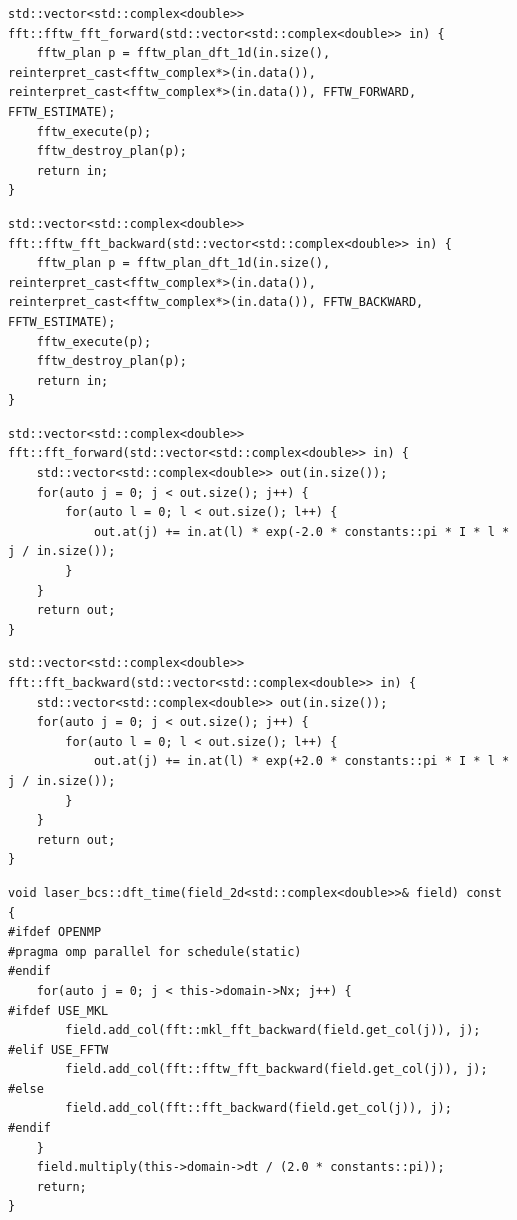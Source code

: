 \begin{lstlisting}[style=CXX, caption=Function performing forward fast Fourier transform using FFTW library]
std::vector<std::complex<double>> fft::fftw_fft_forward(std::vector<std::complex<double>> in) {
	fftw_plan p = fftw_plan_dft_1d(in.size(), reinterpret_cast<fftw_complex*>(in.data()), reinterpret_cast<fftw_complex*>(in.data()), FFTW_FORWARD, FFTW_ESTIMATE);
	fftw_execute(p);
	fftw_destroy_plan(p);
	return in;
}
\end{lstlisting}

\begin{lstlisting}[style=CXX, caption=Function performing backward fast Fourier transform using FFTW library]
std::vector<std::complex<double>> fft::fftw_fft_backward(std::vector<std::complex<double>> in) {
	fftw_plan p = fftw_plan_dft_1d(in.size(), reinterpret_cast<fftw_complex*>(in.data()), reinterpret_cast<fftw_complex*>(in.data()), FFTW_BACKWARD, FFTW_ESTIMATE);
	fftw_execute(p);
	fftw_destroy_plan(p);
	return in;
}
\end{lstlisting}

\begin{lstlisting}[style=CXX, caption=Function performing forward discrete Fourier transform without using any library]
std::vector<std::complex<double>> fft::fft_forward(std::vector<std::complex<double>> in) {
	std::vector<std::complex<double>> out(in.size());
	for(auto j = 0; j < out.size(); j++) {
		for(auto l = 0; l < out.size(); l++) {
			out.at(j) += in.at(l) * exp(-2.0 * constants::pi * I * l * j / in.size());
		}
	}
	return out;
}
\end{lstlisting}

\begin{lstlisting}[style=CXX, caption=Function performing backward discrete Fourier transform without using any library]
std::vector<std::complex<double>> fft::fft_backward(std::vector<std::complex<double>> in) {
	std::vector<std::complex<double>> out(in.size());
	for(auto j = 0; j < out.size(); j++) {
		for(auto l = 0; l < out.size(); l++) {
			out.at(j) += in.at(l) * exp(+2.0 * constants::pi * I * l * j / in.size());
		}
	}
	return out;
}
\end{lstlisting}

\begin{lstlisting}[style=CXX, caption=Method for performing discrete Fourier transform in time]
void laser_bcs::dft_time(field_2d<std::complex<double>>& field) const {
#ifdef OPENMP
#pragma omp parallel for schedule(static)
#endif
	for(auto j = 0; j < this->domain->Nx; j++) {
#ifdef USE_MKL
		field.add_col(fft::mkl_fft_backward(field.get_col(j)), j);
#elif USE_FFTW
		field.add_col(fft::fftw_fft_backward(field.get_col(j)), j);
#else
		field.add_col(fft::fft_backward(field.get_col(j)), j);
#endif
	}
	field.multiply(this->domain->dt / (2.0 * constants::pi));
	return;
}
\end{lstlisting}


